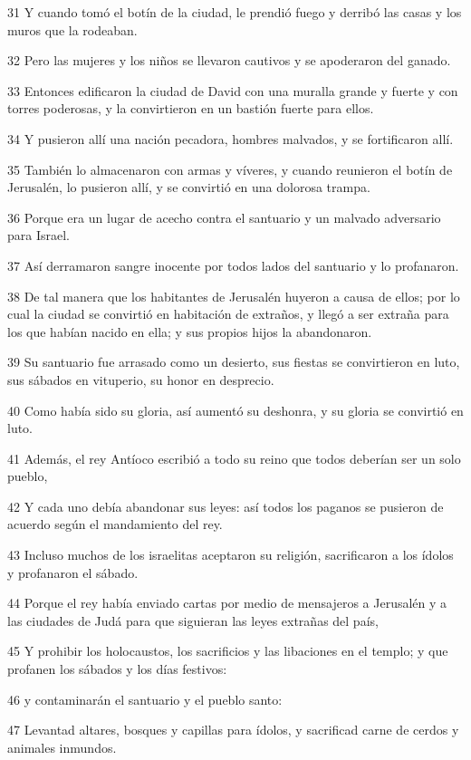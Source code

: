 \par 31 Y cuando tomó el botín de la ciudad, le prendió fuego y derribó las casas y los muros que la rodeaban.
\par 32 Pero las mujeres y los niños se llevaron cautivos y se apoderaron del ganado.
\par 33 Entonces edificaron la ciudad de David con una muralla grande y fuerte y con torres poderosas, y la convirtieron en un bastión fuerte para ellos.
\par 34 Y pusieron allí una nación pecadora, hombres malvados, y se fortificaron allí.
\par 35 También lo almacenaron con armas y víveres, y cuando reunieron el botín de Jerusalén, lo pusieron allí, y se convirtió en una dolorosa trampa.
\par 36 Porque era un lugar de acecho contra el santuario y un malvado adversario para Israel.
\par 37 Así derramaron sangre inocente por todos lados del santuario y lo profanaron.
\par 38 De tal manera que los habitantes de Jerusalén huyeron a causa de ellos; por lo cual la ciudad se convirtió en habitación de extraños, y llegó a ser extraña para los que habían nacido en ella; y sus propios hijos la abandonaron.
\par 39 Su santuario fue arrasado como un desierto, sus fiestas se convirtieron en luto, sus sábados en vituperio, su honor en desprecio.
\par 40 Como había sido su gloria, así aumentó su deshonra, y su gloria se convirtió en luto.
\par 41 Además, el rey Antíoco escribió a todo su reino que todos deberían ser un solo pueblo,
\par 42 Y cada uno debía abandonar sus leyes: así todos los paganos se pusieron de acuerdo según el mandamiento del rey.
\par 43 Incluso muchos de los israelitas aceptaron su religión, sacrificaron a los ídolos y profanaron el sábado.
\par 44 Porque el rey había enviado cartas por medio de mensajeros a Jerusalén y a las ciudades de Judá para que siguieran las leyes extrañas del país,
\par 45 Y prohibir los holocaustos, los sacrificios y las libaciones en el templo; y que profanen los sábados y los días festivos:
\par 46 y contaminarán el santuario y el pueblo santo:
\par 47 Levantad altares, bosques y capillas para ídolos, y sacrificad carne de cerdos y animales inmundos.
